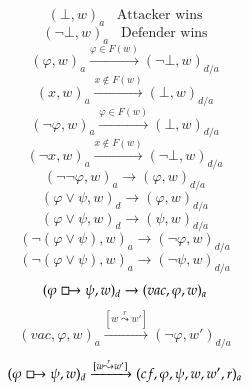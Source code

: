 \documentclass[a4paper,american]{paper}
\begin{document}
\begin{figure}[H]
	\centering
	\begin{equation}
		(\bot ,w)_{a}\hspace{10pt}\text{Attacker wins}
	\end{equation}
	\begin{equation}
		(\neg\bot ,w)_{a}\hspace{10pt}\text{Defender wins}
	\end{equation}
	\begin{equation}
		(\varphi ,w)_{a}\xrightarrow{\varphi\in F(w)}(\neg\bot ,w)_{d/a}
	\end{equation}
	\begin{equation}
		(x,w)_{a}\xrightarrow{x\not\in F(w)}(\bot ,w)_{d/a}
	\end{equation}
	\begin{equation}
		(\neg\varphi ,w)_{a}\xrightarrow{\varphi\in F(w)}(\bot ,w)_{d/a}
	\end{equation}
	\begin{equation}
		(\neg x,w)_{a}\xrightarrow{x\not\in F(w)}(\neg\bot ,w)_{d/a}
	\end{equation}
	\begin{equation}
		(\neg\neg\varphi ,w)_{a}\rightarrow (\varphi ,w)_{d/a}
	\end{equation}
	\begin{equation}
		(\varphi\vee\psi ,w)_d\rightarrow (\varphi ,w)_{d/a}
	\end{equation}
	\begin{equation}
		(\varphi\vee\psi ,w)_d\rightarrow (\psi ,w)_{d/a}
	\end{equation}
	\begin{equation}
		(\neg (\varphi\vee\psi ),w)_a\rightarrow (\neg\varphi ,w)_{d/a}
	\end{equation}
	\begin{equation}
		(\neg (\varphi\vee\psi ),w)_a\rightarrow (\neg\psi ,w)_{d/a}
	\end{equation}
	\begin{equation}
		(\varphi\boxright\psi ,w)_d\rightarrow (vac,\varphi ,w)_a
	\end{equation}
	\begin{equation}
		(vac,\varphi ,w)_a\xrightarrow{[w\overset{r}{\leadsto}w']}(\neg\varphi ,w')_{d/a}
	\end{equation}
	\begin{equation}
		(\varphi\boxright\psi ,w)_d\xrightarrow{[w\overset{r}{\leadsto}w']}(cf,\varphi ,\psi ,w,w',r)_a
	\end{equation}

\end{figure}
\end{document}
